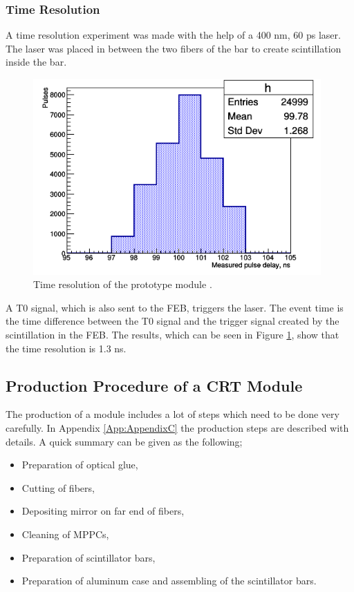 \documentclass[a4paper]{article}\linespread{1.4}
\begin{document}
\subsubsection{Time Resolution}
A time resolution experiment was made with the help of a 400 nm, 60 ps laser. The laser was placed in between the two fibers of the bar to create scintillation inside the bar. 
\begin{figure}[h] \centering \includegraphics[width=110mm,scale=1.0]{trs0.png} \caption{Time resolution of the prototype module \cite{E}.} \label{fig:trs0}\end{figure}
A T0 signal, which is also sent to the FEB, triggers the laser. The event time is the time difference between the T0 signal and the trigger signal created by the scintillation in the FEB. The results, which can be seen in Figure \ref{fig:trs0}, show that the time resolution is 1.3 ns.


\subsection{Production Procedure of a CRT Module}
The production of a module includes a lot of steps which need to be done very carefully. In Appendix \ref{App:AppendixC} the production steps are described with details. A quick summary can be given as the following;
\begin{itemize}
\item Preparation of optical glue,
\item Cutting of fibers,
\item Depositing mirror on far end of fibers,
\item Cleaning of MPPCs,
\item Preparation of scintillator bars,
\item Preparation of aluminum case and assembling of the scintillator bars.
\end{itemize}
\end{document}
